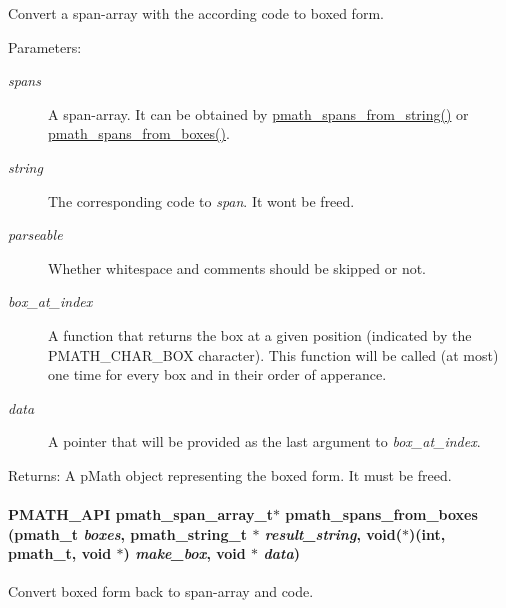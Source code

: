 Convert a span-array with the according code to boxed form. 

\begin{Desc}
\item[Parameters:]
\begin{description}
\item[{\em spans}]A span-array. It can be obtained by \hyperlink{group__parser_g877ac507e27c8791a265105f796f3cef}{pmath\_\-spans\_\-from\_\-string()} or \hyperlink{group__parser_g9914e557782a4c7ff312b2b474fcf045}{pmath\_\-spans\_\-from\_\-boxes()}. \item[{\em string}]The corresponding code to {\em span\/}. It wont be freed. \item[{\em parseable}]Whether whitespace and comments should be skipped or not. \item[{\em box\_\-at\_\-index}]A function that returns the box at a given position (indicated by the PMATH\_\-CHAR\_\-BOX character). This function will be called (at most) one time for every box and in their order of apperance. \item[{\em data}]A pointer that will be provided as the last argument to {\em box\_\-at\_\-index\/}. \end{description}
\end{Desc}
\begin{Desc}
\item[Returns:]A pMath object representing the boxed form. It must be freed. \end{Desc}
\hypertarget{group__parser_g9914e557782a4c7ff312b2b474fcf045}{
\paragraph[{pmath\_\-spans\_\-from\_\-boxes}]{\setlength{\rightskip}{0pt plus 5cm}PMATH\_\-API {\bf pmath\_\-span\_\-array\_\-t}$\ast$ pmath\_\-spans\_\-from\_\-boxes ({\bf pmath\_\-t} {\em boxes}, \/  {\bf pmath\_\-string\_\-t} $\ast$ {\em result\_\-string}, \/  void($\ast$)(int, {\bf pmath\_\-t}, void $\ast$) {\em make\_\-box}, \/  void $\ast$ {\em data})}\hfill}
\label{group__parser_g9914e557782a4c7ff312b2b474fcf045}


Convert boxed form back to span-array and code. 

